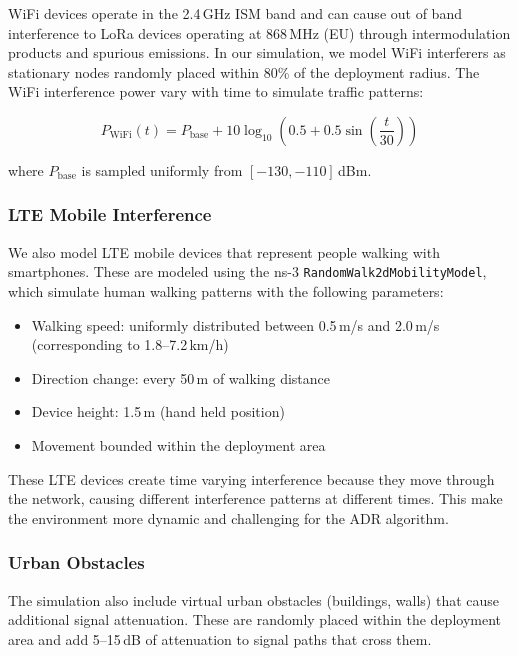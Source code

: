 \documentclass[12pt,a4paper]{article}
\begin{document}
WiFi devices operate in the 2.4\,GHz ISM band and can cause out of band interference to LoRa devices operating at 868\,MHz (EU) through intermodulation products and spurious emissions. In our simulation, we model WiFi interferers as stationary nodes randomly placed within 80\% of the deployment radius. The WiFi interference power vary with time to simulate traffic patterns:

\begin{equation}
    P_{\text{WiFi}}(t) = P_{\text{base}} + 10\log_{10}\left(0.5 + 0.5\sin\left(\frac{t}{30}\right)\right)
    \label{eq:wifi_interference}
\end{equation}

where $P_{\text{base}}$ is sampled uniformly from $[-130, -110]$\,dBm.

\subsubsection{LTE Mobile Interference}

We also model LTE mobile devices that represent people walking with smartphones. These are modeled using the ns-3 \texttt{RandomWalk2dMobilityModel}, which simulate human walking patterns with the following parameters:

\begin{itemize}
    \item Walking speed: uniformly distributed between 0.5\,m/s and 2.0\,m/s (corresponding to 1.8--7.2\,km/h)
    \item Direction change: every 50\,m of walking distance
    \item Device height: 1.5\,m (hand held position)
    \item Movement bounded within the deployment area
\end{itemize}

These LTE devices create time varying interference because they move through the network, causing different interference patterns at different times. This make the environment more dynamic and challenging for the ADR algorithm.

\subsubsection{Urban Obstacles}

The simulation also include virtual urban obstacles (buildings, walls) that cause additional signal attenuation. These are randomly placed within the deployment area and add 5--15\,dB of attenuation to signal paths that cross them.
\end{document}
